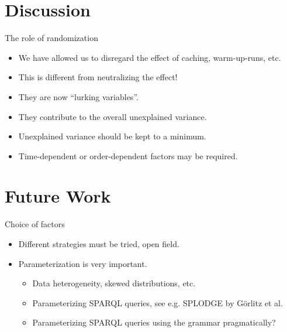 \documentclass[english,usenames,dvipsnames,aspectratio=169]{beamer}
\begin{document}
\section{Discussion}

\begin{frame}{The role of randomization}
  \begin{itemize}
  \item We have allowed us to disregard the effect of caching,
    warm-up-runs, etc.
  \item This is different from neutralizing the effect!
  \item They are now ``lurking variables''.
  \item They contribute to the overall unexplained variance.
  \item Unexplained variance should be kept to a minimum.
  \item Time-dependent or order-dependent factors may be required.
  \end{itemize}
\end{frame}

\section{Future Work}

\begin{frame}{Choice of factors}

  \begin{itemize}
  \item Different strategies must be tried, open field.
  \item Parameterization is very important.
    \begin{itemize}
    \item Data heterogeneity, skewed distributions, etc.
    \item Parameterizing SPARQL queries, see e.g. SPLODGE by Görlitz
      et al.
    \item Parameterizing SPARQL queries using the grammar pragmatically?
    \end{itemize}
  \end{itemize}
  
\end{frame}
\end{document}
